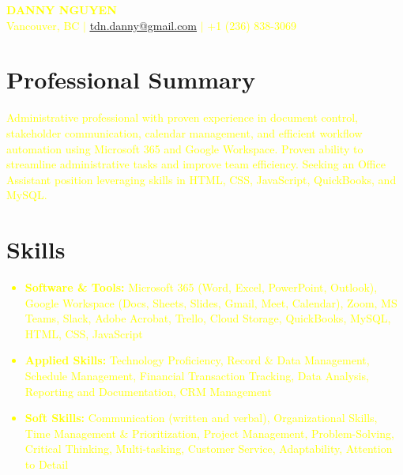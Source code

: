 \documentclass[letterpaper,11pt]{article}
\newcommand{\resumeSubHeadingListStart}{\begin{itemize}[leftmargin=0.15in, label={}]}
\newcommand{\resumeSubHeadingListEnd}{\end{itemize}}
\begin{document}
\begin{center}
\textcolor{yellow}{\textbf{\Huge \scshape DANNY NGUYEN}} \\ \vspace{1pt}
\textcolor{yellow}{\small Vancouver, BC $|$ \href{mailto:tdn.danny@gmail.com}{\underline{tdn.danny@gmail.com}} $|$ +1 (236) 838-3069}
\end{center}

\section{Professional Summary}
\textcolor{yellow}{Administrative professional with proven experience in document control, stakeholder communication, calendar management, and efficient workflow automation using Microsoft 365 and Google Workspace.  Proven ability to streamline administrative tasks and improve team efficiency.  Seeking an Office Assistant position leveraging skills in  HTML, CSS, JavaScript, QuickBooks, and MySQL.}

\section{Skills}
\textcolor{yellow}{\resumeSubHeadingListStart
\item \textbf{Software \& Tools:} Microsoft 365 (Word, Excel, PowerPoint, Outlook), Google Workspace (Docs, Sheets, Slides, Gmail, Meet, Calendar), Zoom, MS Teams, Slack, Adobe Acrobat, Trello, Cloud Storage, QuickBooks, MySQL, HTML, CSS, JavaScript
\item \textbf{Applied Skills:} Technology Proficiency, Record \& Data Management, Schedule Management,  Financial Transaction Tracking, Data Analysis, Reporting and Documentation, CRM Management
\item \textbf{Soft Skills:} Communication (written and verbal), Organizational Skills, Time Management \& Prioritization, Project Management, Problem-Solving, Critical Thinking, Multi-tasking, Customer Service, Adaptability, Attention to Detail
\resumeSubHeadingListEnd}
\end{document}
